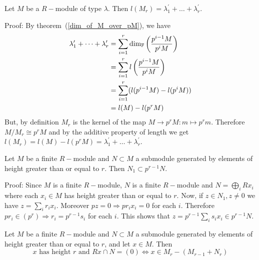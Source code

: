 \begin{dang}
    \begin{lemma}\label{value_of_l(M_r)}\cite{macdonald1998symmetric}
        Let $M$ be a $R-$module of type $\lambda$. Then $l(M_r)=\lambda_1^\prime+\dots+\lambda_r^\prime$.
    \end{lemma}
\end{dang}
Proof: By theorem~(\ref{dim_of_M_over_pM}), we have
\begin{equation}\label{telescopic_sum_for_the_chain_pM}
\begin{split}
     \lambda_1^\prime+\dots+\lambda_r^\prime &=\sum_{i=1}^r\text{dim}_{\mathbb{F}}\left(\frac{p^{i-1}M}{p^iM}\right)\\
     &=\sum_{i=1}^r l\left(\frac{p^{i-1}M}{p^iM}\right)\\
     &=\sum_{i=1}^r (l(p^{i-1}M)-l(p^{i}M))\\
     &=l(M)-l(p^rM)
\end{split}
\end{equation}
But, by definition $M_r$ is the kernel of the map $M\rightarrow p^rM:m\mapsto p^rm$. Therefore $M/M_r\cong p^rM$ and by the additive property of length we get $l(M_r)=l(M)-l(p^rM)= \lambda_1^\prime+\dots+\lambda_r^\prime$.
\begin{dang}
    \begin{lemma}\cite{macdonald1998symmetric}
    Let $M$ be a finite $R-$module and $N\subset M$ a submodule generated by elements of height greater than or equal to $r$. Then $N_1\subset p^{r-1}N$.
    \end{lemma}
\end{dang}
Proof: Since $M$ is a finite $R-$module, $N$ is a finite $R-$module and $N=\bigoplus_i Rx_i$ where each $x_i\in M$ has height greater than or equal to $r$. Now, if $z\in N_1,z\neq0$ we have $z=\sum_ir_ix_i$. Moreover $pz=0\Rightarrow pr_ix_i=0$ for each $i$. Therefore $pr_i\in(p^r)\Rightarrow r_i=p^{r-1}s_i$ for each $i$. This shows that $z=p^{r-1}\sum_is_ix_i\in p^{r-1}N$.
\begin{dang}
    \begin{lemma}\label{x_has_height_r_and_RxcapN=0_iff}\cite{macdonald1998symmetric}
        Let $M$ be a finite $R-$module and $N\subset M$ a submodule generated by elements of height greater than or equal to $r$, and let $x\in M$. Then 
        \begin{equation}
           x\text{ has height }r\text{ and }Rx\cap N=(0) \iff x \in M_r-(M_{r-1}+N_r)
        \end{equation}
    \end{lemma}
\end{dang}

